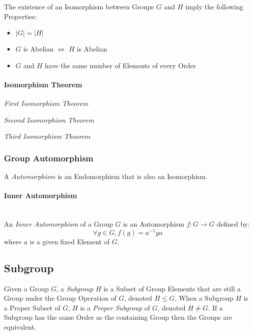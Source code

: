 The existence of an Isomorphism between Groups $G$ and $H$ imply the
following Properties:
\begin{itemize}
    \item $|G| = |H|$
    \item $G$ is Abelian $\Leftrightarrow$ $H$ is Abelian
    \item $G$ and $H$ have the same number of Elements of every Order
\end{itemize}



\paragraph{Isomorphism Theorem}\label{sec:isomorphism_theorem}

\emph{First Isomorphism Theorem}

\emph{Second Isomorphism Theorem}

\emph{Third Isomorphism Theorem}



\subsubsection{Group Automorphism}\label{sec:group_automorphism}

A \emph{Automorphism} is an Endomorphism that is also an Isomorphism.



\paragraph{Inner Automorphism}\label{sec:inner_automorphism}
\hfill \\

An \emph{Inner Automorphism} of a Group $G$ is an Automorphism $f : G
\rightarrow G$ defined by:
\[
    \forall g \in G, f(g) = a^{-1}ga
\]
where $a$ is a given fixed Element of $G$.



\subsection{Subgroup}\label{sec:subgroup}

Given a Group $G$, a \emph{Subgroup} $H$ is a Subset of Group Elements
that are still a Group under the Group Operation of $G$, denoted $H
\leq G$. When a Subgroup $H$ is a Proper Subset of $G$, $H$ is a
\emph{Proper Subgroup} of $G$, denoted $H \neq G$. If a Subgroup has
the same Order as the containing Group then the Groups are equivalent.

